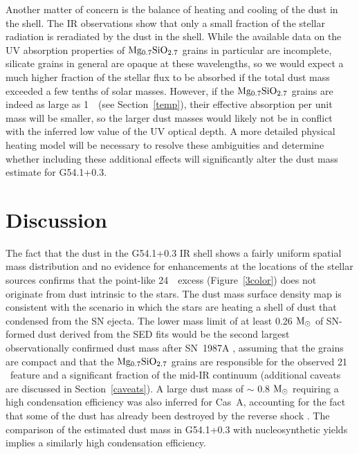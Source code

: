 \documentclass{emulateapj}
\begin{document}
Another matter of concern is the balance of heating and cooling of the dust in the shell. The IR observations show that only a small fraction of the stellar radiation is reradiated by the dust in the shell. While the available data on the UV absorption properties of $\rm Mg_{0.7}SiO_{2.7}$ grains in particular are incomplete, silicate grains in general are opaque at these wavelengths, so we would expect a much higher fraction of the stellar flux to be absorbed if the total dust mass exceeded a few tenths of solar masses.
However, if the $\rm Mg_{0.7}SiO_{2.7}$ grains are indeed as large as 1~\micron\ (see Section~\ref{temp}), their effective absorption per unit mass will be smaller, so the larger dust masses would likely not be in conflict with the inferred low value of the UV optical depth.
A more detailed physical heating model will be necessary to resolve these ambiguities and determine whether including these additional effects will significantly alter the dust mass estimate for G54.1+0.3.


\section{Discussion}\label{disc}

The fact that the dust in the G54.1+0.3 IR shell shows a fairly uniform spatial mass distribution and no evidence for enhancements at the locations of the stellar sources confirms that the point-like 24~\micron\ excess (Figure~\ref{3color}) does not originate from dust intrinsic to the stars. The dust mass surface density map is consistent with the scenario in which the stars are heating a shell of dust that condensed from the SN ejecta.
The lower mass limit of at least 0.26 $\rm M_{\odot}$ of SN-formed dust derived from the SED fits would be the second largest observationally confirmed dust mass after SN~1987A \citep{matsuura15, dwek15}, assuming that the grains are compact and that the $\rm Mg_{0.7}SiO_{2.7}$ grains are responsible for the observed 21 \micron\ feature and a significant fraction of the mid-IR continuum (additional caveats are discussed in Section~\ref{caveats}). A large dust mass of $\sim$ 0.8 $\rm M_{\odot}$ requiring a high condensation efficiency was also inferred for Cas~A, accounting for the fact that some of the dust has already been destroyed by the reverse shock \cite{micelotta16}. The comparison of the estimated dust mass in G54.1+0.3 with nucleosynthetic yields implies a similarly high condensation efficiency.
\end{document}

